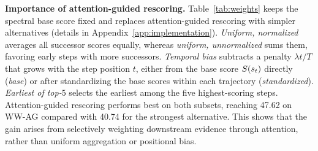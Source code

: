 \textbf{Importance of attention-guided rescoring.}
Table~\ref{tab:weights} keeps the spectral base score fixed and replaces attention-guided rescoring with simpler alternatives (details in Appendix~\ref{app:implementation}). \emph{Uniform, normalized} averages all successor scores equally, whereas \emph{uniform, unnormalized} sums them, favoring early steps with more successors. \emph{Temporal bias} subtracts a penalty $\lambda t/T$ that grows with the step position $t$, either from the base score $S(s_t)$ directly (\emph{base}) or after standardizing the base scores within each trajectory (\emph{standardized}). \emph{Earliest of top-$5$} selects the earliest among the five highest-scoring steps. Attention-guided rescoring performs best on both subsets, reaching 47.62 on \textsc{WW-AG} compared with 40.74 for the strongest alternative. This shows that the gain arises from selectively weighting downstream evidence through attention, rather than uniform aggregation or positional bias.



